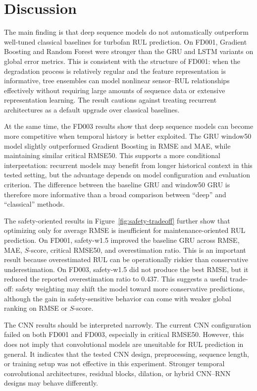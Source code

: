 \documentclass[11pt,a4paper]{article}
\begin{document}
\section{Discussion}

The main finding is that deep sequence models do not automatically outperform well-tuned classical baselines for turbofan RUL prediction. On FD001, Gradient Boosting and Random Forest were stronger than the GRU and LSTM variants on global error metrics. This is consistent with the structure of FD001: when the degradation process is relatively regular and the feature representation is informative, tree ensembles can model nonlinear sensor--RUL relationships effectively without requiring large amounts of sequence data or extensive representation learning. The result cautions against treating recurrent architectures as a default upgrade over classical baselines.

At the same time, the FD003 results show that deep sequence models can become more competitive when temporal history is better exploited. The GRU window50 model slightly outperformed Gradient Boosting in RMSE and MAE, while maintaining similar critical RMSE50. This supports a more conditional interpretation: recurrent models may benefit from longer historical context in this tested setting, but the advantage depends on model configuration and evaluation criterion. The difference between the baseline GRU and window50 GRU is therefore more informative than a broad comparison between ``deep'' and ``classical'' methods.

The safety-oriented results in Figure~\ref{fig:safety-tradeoff} further show that optimizing only for average RMSE is insufficient for maintenance-oriented RUL prediction. On FD001, safety-w1.5 improved the baseline GRU across RMSE, MAE, \(\textit{S}\)-score, critical RMSE50, and overestimation ratio. This is an important result because overestimated RUL can be operationally riskier than conservative underestimation. On FD003, safety-w1.5 did not produce the best RMSE, but it reduced the reported overestimation ratio to \(0.437\). This suggests a useful trade-off: safety weighting may shift the model toward more conservative predictions, although the gain in safety-sensitive behavior can come with weaker global ranking on RMSE or \(\textit{S}\)-score.

The CNN results should be interpreted narrowly. The current CNN configuration failed on both FD001 and FD003, especially in critical RMSE50. However, this does not imply that convolutional models are unsuitable for RUL prediction in general. It indicates that the tested CNN design, preprocessing, sequence length, or training setup was not effective in this experiment. Stronger temporal convolutional architectures, residual blocks, dilation, or hybrid CNN--RNN designs may behave differently.
\end{document}
